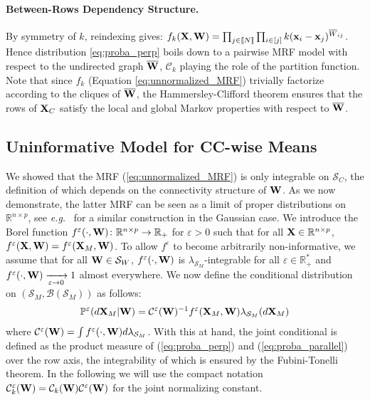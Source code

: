 \paragraph{Between-Rows Dependency Structure.} By symmetry of $k$, reindexing gives: $f_{k}(\mathbf{X}, {\mathbf{W}}) = \prod_{j \in {[\![N]\!]}} \prod_{i \in [j]} k(\mathbf{x}_{i} - \mathbf{x}_{j})^{\overline{W}_{ij}}$. Hence distribution \eqref{eq:proba_perp} boils down to a pairwise MRF model \citep{clifford1990markov} with respect to the undirected graph $\overline{{\mathbf{W}}}$, $\mathcal{C}_{k}$ playing the role of the partition function. Note that since $f_k$ (Equation \ref{eq:unnormalized_MRF}) trivially factorize according to the cliques of $\overline{{\mathbf{W}}}$, the Hammersley-Clifford theorem ensures that the rows of $\mathbf{X}_{C}$ satisfy the local and global Markov properties with respect to $\overline{{\mathbf{W}}}$. 

\subsection{Uninformative Model for CC-wise Means}

We showed that the MRF (\ref{eq:unnormalized_MRF}) is only integrable on $\mathcal{S}_{C}$, the definition of which depends on the connectivity structure of ${\mathbf{W}}$. As we now demonstrate, the latter MRF can be seen as a limit of proper distributions on $\mathbb{R}^{n \times p}$, see \textit{e.g.}\ \cite{rue2005gaussian} for a similar construction in the Gaussian case. 
We introduce the Borel function $f^{\varepsilon}(\cdot, {\mathbf{W}}) \colon \mathbb{R}^{n \times p} \to \mathbb{R}_+$ for $\varepsilon > 0$ such that for all $\mathbf{X} \in \mathbb{R}^{n \times p}$, $f^{\varepsilon}(\mathbf{X}, {\mathbf{W}}) = f^{\varepsilon}(\mathbf{X}_{M}, {\mathbf{W}})$. To allow $f^{\varepsilon}$ to become arbitrarily non-informative, we assume that for all ${\mathbf{W}} \in \mathcal{S}_{W}$, $f^\varepsilon(\cdot, {\mathbf{W}})$ is $\lambda_{\mathcal{S}_{M}}$-integrable for all $\varepsilon \in \mathbb{R}^*_+$ and $f^{\varepsilon}(\cdot, {\mathbf{W}}) \xrightarrow[\varepsilon \to 0]{} 1$ almost everywhere.
We now define the conditional distribution on $(\mathcal{S}_{M}, \mathcal{B}(\mathcal{S}_{M}))$ as follows:
\begin{align}\label{eq:proba_parallel}
     \mathbb{P}^{\varepsilon}(d\mathbf{X}_{M}| {\mathbf{W}}) = \mathcal{C}^{\varepsilon}({\mathbf{W}})^{-1} f^{\varepsilon}(\mathbf{X}_{M}, {\mathbf{W}}) \lambda_{\mathcal{S}_{M}}(d\mathbf{X}_{M})
\end{align}
where $\mathcal{C}^{\varepsilon}({\mathbf{W}}) = \int f^{\varepsilon}(\cdot, {\mathbf{W}}) d\lambda_{\mathcal{S}_{M}}$.
With this at hand, the joint conditional is defined as the product measure of (\ref{eq:proba_perp}) and (\ref{eq:proba_parallel}) over the row axis, the integrability of which is ensured by the Fubini-Tonelli theorem. In the following we will use the compact notation $\mathcal{C}^{\varepsilon}_k({\mathbf{W}}) = \mathcal{C}_k({\mathbf{W}})\mathcal{C}^{\varepsilon}({\mathbf{W}})$ for the joint normalizing constant.


